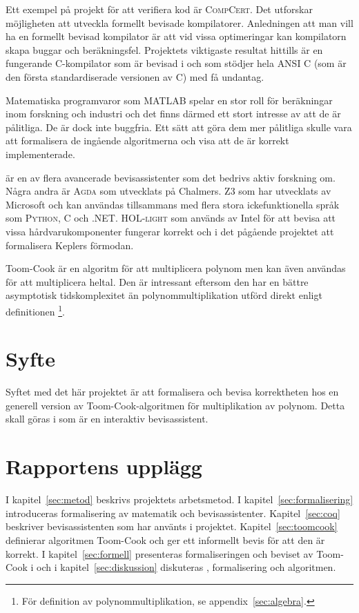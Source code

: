 Ett exempel på projekt för att verifiera kod är \textsc{CompCert}. Det
utforskar möjligheten att utveckla formellt bevisade kompilatorer. Anledningen
att man vill ha en formellt bevisad kompilator är att vid vissa optimeringar
kan kompilatorn skapa buggar och beräkningsfel. Projektets viktigaste resultat
hittills är en fungerande C-kompilator som är bevisad i \coq{} och som stödjer
hela \textsc{ANSI C} (som är den första standardiserade versionen av
\textsc{C}) med få undantag\cite{compcert}.

Matematiska programvaror som \textsc{MATLAB} spelar en stor roll för
beräkningar inom forskning och industri och det finns därmed ett stort intresse
av att de är pålitliga. De är dock inte buggfria. Ett sätt att göra dem mer
pålitliga skulle vara att formalisera de ingående algoritmerna och visa att de
är korrekt implementerade\cite{denes2012refinement}.

\coq{} är en av flera avancerade bevisassistenter som det bedrivs aktiv
forskning om. Några andra är \textsc{Agda} som utvecklats på Chalmers.
\textsc{Z3} som har utvecklats av Microsoft och kan användas tillsammans med
flera stora ickefunktionella språk som \textsc{Python}, \textsc{C} och
\textsc{.NET}. \textsc{HOL-light} som används av Intel för att bevisa att vissa
hårdvarukomponenter fungerar korrekt och i det pågående projektet att
formalisera Keplers förmodan\cite{hales2008formal}.

Toom-Cook är en algoritm för att multiplicera polynom men kan även användas
för att multiplicera heltal. Den är intressant eftersom den har en bättre
asymptotisk tidskomplexitet än polynommultiplikation utförd direkt enligt
definitionen \footnote{För definition av polynommultiplikation, se
appendix~\ref{sec:algebra}.}.

\section{Syfte}
Syftet med det här projektet är att formalisera och bevisa korrektheten hos en
generell version av Toom-Cook-algoritmen för multiplikation av polynom. Detta
skall göras i \coq{} som är en interaktiv bevisassistent.

\section{Rapportens upplägg}
I kapitel~\ref{sec:metod} beskrivs projektets arbetsmetod. I
kapitel~\ref{sec:formalisering} introduceras formalisering av matematik och
bevisassistenter. Kapitel~\ref{sec:coq} beskriver bevisassistenten \coq{} som har
använts i projektet. Kapitel~\ref{sec:toomcook} definierar algoritmen Toom-Cook och
ger ett informellt bevis för att den är korrekt. I kapitel~\ref{sec:formell}
presenteras formaliseringen och beviset av Toom-Cook i \coq{} och i
kapitel~\ref{sec:diskussion} diskuteras \coq{}, formalisering och algoritmen.

